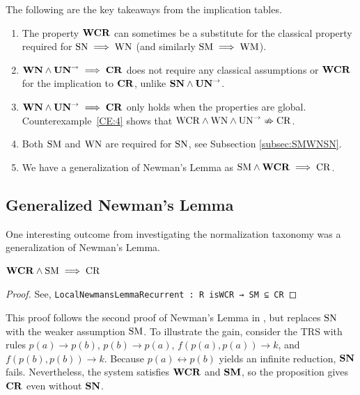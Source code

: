\begin{remark} The following are the key takeaways from the implication tables. \hfill
    \begin{enumerate}
        \item The property $\mathbf{WCR}$ can sometimes be a substitute for the classical
        property required for $\mathrm{SN} \implies \mathrm{WN}$ (and similarly $\mathrm{SM} \implies \mathrm{WM}$).
        \item $\mathbf{WN} \land \mathbf{UN}^{\to} \implies \mathbf{CR}$ does not require any classical assumptions
         or $\mathbf{WCR}$ for the implication to $\mathbf{CR}$, unlike $\mathbf{SN} \land \mathbf{UN}^{\to}$.
        \item $\mathbf{WN} \land \mathbf{UN}^{\to} \implies \mathbf{CR}$ only holds when the properties are global. Counterexample~\ref{CE:4} shows that $\mathrm{WCR} \land \mathrm{WN} \land \mathrm{UN}^{\to} \nRightarrow \mathrm{CR}$.
        \item Both $\mathrm{SM}$ and $\mathrm{WN}$ are required for $\mathrm{SN}$, see Subsection \ref{subsec:SMWNSN}.
        \item We have a generalization of Newman's Lemma as $\mathrm{SM} \land \mathbf{WCR} \implies \mathrm{CR}$.
    \end{enumerate}
\end{remark}

\subsection{Generalized Newman's Lemma}\label{subsec:newnewman}
One interesting outcome from investigating the normalization taxonomy was a generalization of Newman's Lemma.

\begin{proposition}
    $\mathbf{WCR} \land \mathrm{SM} \implies \mathrm{CR}$
\end{proposition}
\begin{proof}
    See, \verb|LocalNewmansLemmaRecurrent : R isWCR → SM ⊆ CR|
\end{proof}

This proof follows the second proof of Newman's Lemma in \terese, but replaces
$\mathrm{SN}$ with the weaker assumption $\mathrm{SM}$. To illustrate the gain, consider the TRS with rules
$p(a) \to p(b)$, $p(b) \to p(a)$, $f(p(a),p(a)) \to k$, and $f(p(b),p(b)) \to k$.
Because $p(a) \leftrightarrow p(b)$ yields an infinite reduction, $\mathbf{SN}$ fails. Nevertheless,
the system satisfies $\mathbf{WCR}$ and $\mathbf{SM}$, so the proposition gives $\mathbf{CR}$ even without $\mathbf{SN}$.

